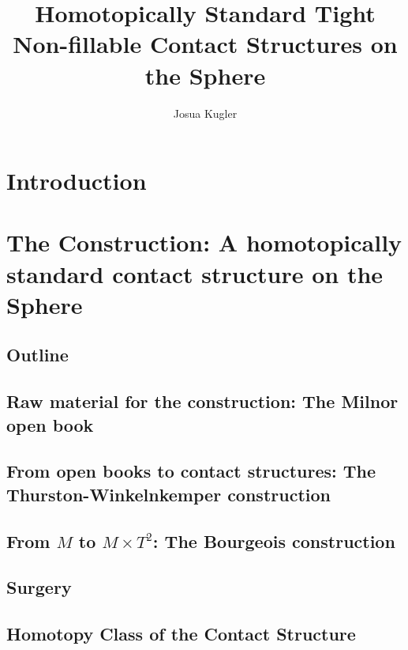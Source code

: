 \documentclass[oneside]{amsbook}
\title{Homotopically Standard Tight Non-fillable Contact Structures on the Sphere}
\author{Josua Kugler}
\begin{document}
\maketitle


\newpage

\newpage
\hspace{0pt}
\vfill

\vfill
\hspace{0pt}

\tableofcontents
\chapter{Introduction}


\chapter[Construction]{The Construction: A homotopically standard contact structure on the Sphere}\label{chap:construction}
\section{Outline}

\section[The Milnor open book]{Raw material for the construction: The Milnor open book} \label{sec:milnor}

\section[The Thurston-Winkelnkemper-construction]{From open books to contact structures: The Thurston-Winkelnkemper construction}

\section[The Bourgeois construction]{From \texorpdfstring{$M$}{M} to \texorpdfstring{$M \times T^2$}{M x T2}: The Bourgeois construction}


\section{Surgery}



\section[Homotopy Class of the Contact Structure]{Homotopy Class of the Contact Structure} \label{homotopically_standard}

\end{document}
